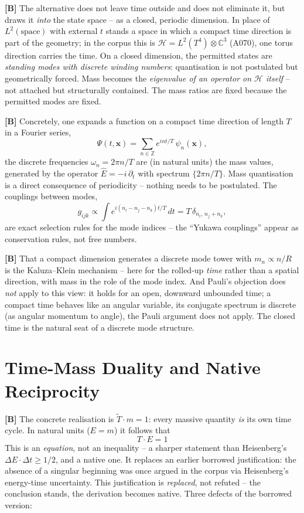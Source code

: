 \textbf{[B]} The alternative does not leave time outside and does not eliminate
it, but draws it \emph{into} the state space -- as a closed, periodic dimension.
In place of $L^2(\text{space})$ with external $t$ stands a space in which a
compact time direction is part of the geometry; in the corpus this is
$\mathcal H = L^2(T^4)\otimes\mathbb{C}^3$ (A070), one torus direction carries
the time. On a closed dimension, the permitted states are \emph{standing modes
with discrete winding numbers}: quantisation is not postulated but geometrically
forced. Mass becomes the \emph{eigenvalue of an operator on $\mathcal H$ itself}
-- not attached but structurally contained. The mass ratios are fixed because the
permitted modes are fixed.

\textbf{[B]} Concretely, one expands a function on a compact time direction of
length $T$ in a Fourier series,
\[
  \Psi(t,\mathbf x) = \sum_{n\in\mathbb Z} e^{i n t/T}\,\psi_n(\mathbf x),
\]
the discrete frequencies $\omega_n = 2\pi n/T$ are (in natural units) the mass
values, generated by the operator $\hat E = -i\,\partial_t$ with spectrum
$\{2\pi n/T\}$. Mass quantisation is a direct consequence of periodicity --
nothing needs to be postulated. The couplings between modes,
\[
  g_{ijk} \propto \int e^{i(n_i-n_j-n_k)t/T}\,dt = T\,\delta_{n_i,\,n_j+n_k},
\]
are exact selection rules for the mode indices -- the ``Yukawa couplings'' appear
as conservation rules, not free numbers.

\textbf{[B]} That a compact dimension generates a discrete mode tower with
$m_n\propto n/R$ is the Kaluza--Klein mechanism -- here for the rolled-up
\emph{time} rather than a spatial direction, with mass in the role of the mode
index. And Pauli's objection does \emph{not} apply to this view: it holds for
an open, downward unbounded time; a compact time behaves like an angular
variable, its conjugate spectrum is discrete (as angular momentum to angle), the
Pauli argument does not apply. The closed time is the natural seat of a discrete
mode structure.

\section{Time-Mass Duality and Native Reciprocity}

\textbf{[B]} The concrete realisation is $\tilde T\cdot m = 1$: every massive
quantity \emph{is} its own time cycle. In natural units ($E=m$) it follows that
\[
  \boxed{\;T\cdot E = 1\;}
\]
This is an \emph{equation}, not an inequality -- a sharper statement than
Heisenberg's $\Delta E\cdot\Delta t\ge 1/2$, and a native one. It replaces an
earlier borrowed justification: the absence of a singular beginning was once
argued in the corpus via Heisenberg's energy-time uncertainty. This justification
is \emph{replaced}, not refuted -- the conclusion stands, the derivation becomes
native. Three defects of the borrowed version:

